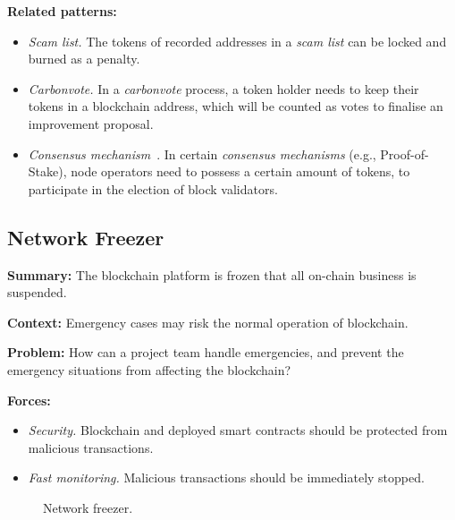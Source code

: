 \documentclass{article}
\begin{document}
\vspace{0.5em}\noindent \textbf{Related patterns:} 

\begin{itemize}
    \item \textit{Scam list.} The tokens of recorded addresses in a \textit{scam list} can be locked and burned as a penalty.

    \item \textit{Carbonvote.} In a \textit{carbonvote} process, a token holder needs to keep their tokens in a blockchain address, which will be counted as votes to finalise an improvement proposal.
    
    \item \textit{Consensus mechanism}~\cite{consensus_survey}. In certain \textit{consensus mechanisms} (e.g., Proof-of-Stake), node operators need to possess a certain amount of tokens, to participate in the election of block validators.
\end{itemize}



\subsection{Network Freezer}

\vspace{0.5em}\noindent \textbf{Summary:} The blockchain platform is frozen that all on-chain business is suspended.

\vspace{0.5em}\noindent \textbf{Context:} Emergency cases may risk the normal operation of blockchain.

\vspace{0.5em}\noindent \textbf{Problem:} How can a project team handle emergencies, and prevent the emergency situations from affecting the blockchain?

\vspace{0.5em}\noindent \textbf{Forces:} 

\begin{itemize}
  \item \textit{Security.} Blockchain and deployed smart contracts should be protected from malicious transactions.

  
  \item \textit{Fast monitoring.} Malicious transactions should be immediately stopped.

\end{itemize}


\begin{figure}[!ht]
	\centering
    \caption{Network freezer.}
	\label{pic:network_freezer}
\end{figure}
\end{document}
